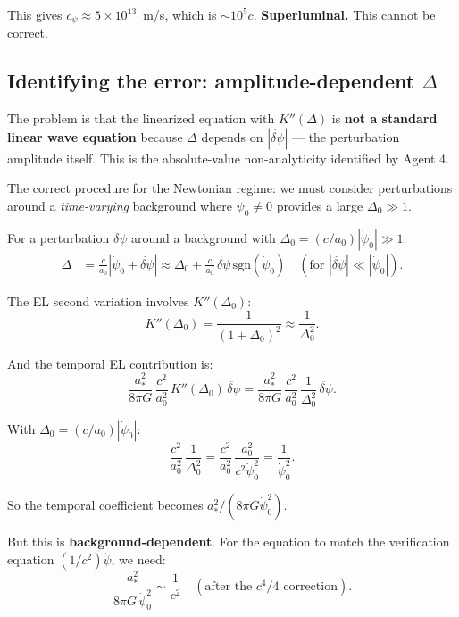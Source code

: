 \documentclass[11pt]{article}
\newcommand{\ee}[1]{\times 10^{#1}}
\begin{document}
This gives $c_\psi \approx 5\ee{13}$~m/s, which is $\sim 10^5 c$.
\textbf{Superluminal.} This cannot be correct.

\subsection{Identifying the error: amplitude-dependent $\Delta$}

The problem is that the linearized equation with $K''(\Delta)$ is
\textbf{not a standard linear wave equation} because $\Delta$ depends
on $|\dot{\delta\psi}|$ --- the perturbation amplitude itself. This
is the absolute-value non-analyticity identified by Agent 4.

The correct procedure for the Newtonian regime: we must consider
perturbations around a \emph{time-varying} background where
$\dot\psi_0 \neq 0$ provides a large $\Delta_0 \gg 1$.

For a perturbation $\delta\psi$ around a background with
$\Delta_0 = (c/a_0)|\dot\psi_0| \gg 1$:
\begin{align}
\Delta &= \frac{c}{a_0}|\dot\psi_0 + \dot{\delta\psi}|
\approx \Delta_0 + \frac{c}{a_0}\,\dot{\delta\psi}\,\text{sgn}(\dot\psi_0)
\quad (\text{for } |\dot{\delta\psi}| \ll |\dot\psi_0|).
\end{align}

The EL second variation involves $K''(\Delta_0)$:
\begin{equation}
K''(\Delta_0) = \frac{1}{(1+\Delta_0)^2} \approx \frac{1}{\Delta_0^2}.
\end{equation}

And the temporal EL contribution is:
\begin{equation}
\frac{a_*^2}{8\pi G}\,\frac{c^2}{a_0^2}\,K''(\Delta_0)\,\ddot{\delta\psi}
= \frac{a_*^2}{8\pi G}\,\frac{c^2}{a_0^2}\,\frac{1}{\Delta_0^2}\,\ddot{\delta\psi}.
\end{equation}

With $\Delta_0 = (c/a_0)|\dot\psi_0|$:
\begin{equation}
\frac{c^2}{a_0^2}\,\frac{1}{\Delta_0^2}
= \frac{c^2}{a_0^2}\,\frac{a_0^2}{c^2\dot\psi_0^2}
= \frac{1}{\dot\psi_0^2}.
\end{equation}

So the temporal coefficient becomes $a_*^2/(8\pi G \dot\psi_0^2)$.

But this is \textbf{background-dependent}. For the equation to
match the verification equation $(1/c^2)\ddot\psi$, we need:
\begin{equation}
\frac{a_*^2}{8\pi G\,\dot\psi_0^2} \sim \frac{1}{c^2}
\quad (\text{after the $c^4/4$ correction}).
\end{equation}
\end{document}
